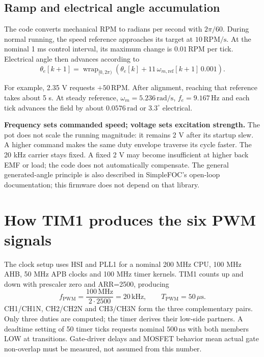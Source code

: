 \documentclass[11pt,letterpaper]{article}
\newcommand{\rpm}{\mathrm{RPM}}
\begin{document}
\subsection{Ramp and electrical angle accumulation}

The code converts mechanical RPM to radians per second with $2\pi/60$.
During normal running, the speed reference approaches its target at
$10\,\rpm/\mathrm{s}$. At the nominal 1 ms control interval, its maximum change
is $0.01\,\rpm$ per tick. Electrical angle then advances according to
\begin{equation}
 \theta_e[k+1]=\operatorname{wrap}_{[0,2\pi)}
 \left(\theta_e[k]+11\,\omega_{m,\mathrm{ref}}[k+1]\,0.001\right).
 \label{eq:angle}
\end{equation}

For example, 2.35 V requests $+50\,\rpm$. After alignment, reaching that
reference takes about 5 s. At steady reference, $\omega_m=5.236\,\mathrm{rad/s}$,
$f_e=9.167\,\mathrm{Hz}$ and each tick advances the field by about
$0.0576\,\mathrm{rad}$ or $3.3^\circ$ electrical.

\textbf{Frequency sets commanded speed; voltage sets excitation strength.}
The pot does not scale the running magnitude: it remains 2 V after its
startup slew. A higher command makes the same duty envelope traverse its cycle
faster. The 20 kHz carrier stays fixed. A fixed 2 V may become insufficient
at higher back EMF or load; the code does not automatically compensate.
The general generated-angle principle is also described in
SimpleFOC's open-loop documentation; this firmware does not depend on that
library.\cite{simplefoc}

\section{How TIM1 produces the six PWM signals}

The clock setup uses HSI and PLL1 for a nominal 200 MHz CPU, 100 MHz AHB,
50 MHz APB clocks and 100 MHz timer kernels. TIM1 counts up and down with
prescaler zero and ARR=2500, producing
\begin{equation}
  f_{\mathrm{PWM}}=\frac{100\,\mathrm{MHz}}{2\cdot2500}
                 =20\,\mathrm{kHz},\qquad T_{\mathrm{PWM}}=50\,\mu\mathrm{s}.
\end{equation}
CH1/CH1N, CH2/CH2N and CH3/CH3N form the three complementary pairs. Only three
duties are computed; the timer derives their low-side partners. A deadtime
setting of 50 timer ticks requests nominal $500\,\mathrm{ns}$ with both
members LOW at transitions. Gate-driver delays and MOSFET behavior mean actual
gate non-overlap must be measured, not assumed from this number.\cite{drv}
\end{document}
